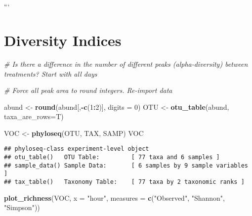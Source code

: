 \documentclass[]{article}
\newenvironment{Shaded}{\begin{snugshade}}{\end{snugshade}}
\newcommand{\KeywordTok}[1]{\textcolor[rgb]{0.13,0.29,0.53}{\textbf{#1}}}
\newcommand{\DataTypeTok}[1]{\textcolor[rgb]{0.13,0.29,0.53}{#1}}
\newcommand{\DecValTok}[1]{\textcolor[rgb]{0.00,0.00,0.81}{#1}}
\newcommand{\StringTok}[1]{\textcolor[rgb]{0.31,0.60,0.02}{#1}}
\newcommand{\CommentTok}[1]{\textcolor[rgb]{0.56,0.35,0.01}{\textit{#1}}}
\newcommand{\OperatorTok}[1]{\textcolor[rgb]{0.81,0.36,0.00}{\textbf{#1}}}
\newcommand{\NormalTok}[1]{#1}
\begin{document}
\section{}\label{section-16}

\subsection{}\label{section-17}

\subsubsection{}\label{section-18}

```

\section{Diversity Indices}\label{diversity-indices}

\begin{Shaded}
\begin{Highlighting}[]
\CommentTok{# Is there a difference in the number of different peaks (alpha-diversity) between treatments? Start with all days}

\CommentTok{# Force all peak area to round integers. Re-import data}

\NormalTok{abund <-}\StringTok{ }\KeywordTok{round}\NormalTok{(abund[,}\OperatorTok{-}\KeywordTok{c}\NormalTok{(}\DecValTok{1}\OperatorTok{:}\DecValTok{2}\NormalTok{)], }\DataTypeTok{digits =} \DecValTok{0}\NormalTok{)}
\NormalTok{OTU <-}\StringTok{ }\KeywordTok{otu_table}\NormalTok{(abund, }\DataTypeTok{taxa_are_rows=}\NormalTok{T) }

\NormalTok{VOC <-}\StringTok{ }\KeywordTok{phyloseq}\NormalTok{(OTU, TAX, SAMP)}
\NormalTok{VOC}
\end{Highlighting}
\end{Shaded}

\begin{verbatim}
## phyloseq-class experiment-level object
## otu_table()   OTU Table:         [ 77 taxa and 6 samples ]
## sample_data() Sample Data:       [ 6 samples by 9 sample variables ]
## tax_table()   Taxonomy Table:    [ 77 taxa by 2 taxonomic ranks ]
\end{verbatim}

\begin{Shaded}
\begin{Highlighting}[]
\KeywordTok{plot_richness}\NormalTok{(VOC, }\DataTypeTok{x =} \StringTok{"hour"}\NormalTok{, }\DataTypeTok{measures =} \KeywordTok{c}\NormalTok{(}\StringTok{"Observed"}\NormalTok{, }\StringTok{"Shannon"}\NormalTok{, }\StringTok{"Simpson"}\NormalTok{))}
\end{Highlighting}
\end{Shaded}
\end{document}
